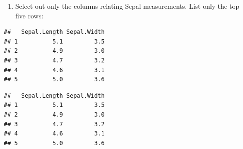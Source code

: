 \documentclass[]{book}
\newenvironment{Shaded}{\begin{snugshade}}{\end{snugshade}}
\newcommand{\CommentTok}[1]{\textcolor[rgb]{0.56,0.35,0.01}{\textit{#1}}}
\newcommand{\DecValTok}[1]{\textcolor[rgb]{0.00,0.00,0.81}{#1}}
\newcommand{\KeywordTok}[1]{\textcolor[rgb]{0.13,0.29,0.53}{\textbf{#1}}}
\newcommand{\NormalTok}[1]{#1}
\newcommand{\OperatorTok}[1]{\textcolor[rgb]{0.81,0.36,0.00}{\textbf{#1}}}
\newcommand{\StringTok}[1]{\textcolor[rgb]{0.31,0.60,0.02}{#1}}
\providecommand{\tightlist}{%
  \setlength{\itemsep}{0pt}\setlength{\parskip}{0pt}}
\begin{document}
\begin{enumerate}
\def\labelenumi{\arabic{enumi})}
\setcounter{enumi}{1}
\tightlist
\item
  Select out only the columns relating Sepal measurements. List only the top five rows:
\end{enumerate}

\begin{Shaded}
\end{Shaded}

\begin{verbatim}
##   Sepal.Length Sepal.Width
## 1          5.1         3.5
## 2          4.9         3.0
## 3          4.7         3.2
## 4          4.6         3.1
## 5          5.0         3.6
\end{verbatim}

\begin{Shaded}
\end{Shaded}

\begin{verbatim}
##   Sepal.Length Sepal.Width
## 1          5.1         3.5
## 2          4.9         3.0
## 3          4.7         3.2
## 4          4.6         3.1
## 5          5.0         3.6
\end{verbatim}

\begin{Shaded}
\end{Shaded}
\end{document}
